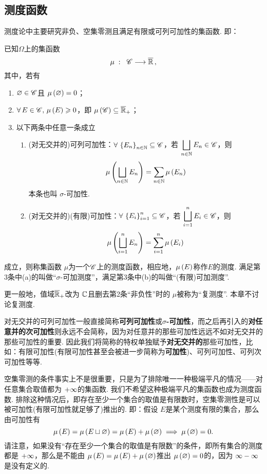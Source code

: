 \subsection{测度函数}

测度论中主要研究非负、空集零测且满足有限或可列可加性的集函数. 即：
\begin{definition}[测度函数]\label{测度函数定义}
    已知$\Omega$上的集函数
    \[\mu\;:\;\; \mathscr{C} \longrightarrow \overline{\mathbb{R}}\,,\]
    其中，若有
    \begin{enumerate}
        \item $\varnothing\in\mathscr{C}$且 $\mu\left(\varnothing\right)=0$；
        \item $\forall\,E\in\mathscr{C},\,\mu\left(E\right)\geqslant 0$，即 $\mu\left(\mathscr{C}\right)\subseteq\overline{\mathbb{R}}_+$；
        \item 以下两条中任意一条成立
        \begin{enumerate}
            \item (对无交并的)可列可加性：$\forall\,\left\{ E_n \right\}_{n\in\mathbb{N}}\subseteq\mathscr{C}$，若 $\displaystyle \bigsqcup_{n\in\mathbb{N}} E_n\in\mathscr{C}$，则
            \[  \mu\left( \bigsqcup_{n\in\mathbb{N}} E_n \right) = \sum_{n\in\mathbb{N}} \mu\left(E_n\right)  \]
            本条也叫 $\sigma$-可加性.
            \item (对无交并的)(有限)可加性：$\forall\,\left\{ E_i \right\}_{i=1}^n\subseteq\mathscr{C}$，若 $\displaystyle \bigsqcup_{i=1}^n E_i\in\mathscr{C}$，则
            \[  \mu\left( \bigsqcup_{i=1}^n E_n \right) = \sum_{i=1}^n \mu\left(E_i\right)  \]
        \end{enumerate}
    \end{enumerate}
    成立，则称集函数 $\mu$为一个$\mathscr{C}$上的测度函数，相应地，$\mu\left(E\right)$称作$E$的测度. 满足第3条中(a)的叫做“$\sigma$-可加测度”，满足第3条中(b)的叫做“(有限)可加测度”. 

    更一般地，值域$\overline{\mathbb{R}}_+$改为 $\mathbb{C}$且删去第2条“非负性”时的 $\mu$被称为“复测度”. 本章不讨论复测度.
\end{definition}
\begin{remark}
    对无交并的可列可加性一般直接简称\textbf{可列可加性}或\textbf{$\sigma$-可加性}，而之后再引入的\textbf{对任意并的次可加性}则永远不会简称，因为对任意并的那些可加性远远不如对无交并的那些可加性的重要. 因此我们将简称的特权单独赋予\textbf{对无交并的}那些可加性，比如：有限可加性(有限可加性甚至会被进一步简称为\textbf{可加性})、可列可加性、可列次可加性等等.
\end{remark}
\vspace{0.5cm}

\begin{remark}
    空集零测的条件事实上不是很重要，只是为了排除唯一一种极端平凡的情况——对任意集合取值都为 $+\infty$的集函数. 我们不希望这种极端平凡的集函数也成为测度函数. 排除这种情况后，即存在至少一个集合的取值是有限数时，空集零测性是可以被可加性(有限可加性就足够了)推出的. 即：假设 $E$是某个测度有限的集合，那么由可加性有
    \[  \mu\left(E\right)=\mu\left(E\sqcup\varnothing\right)=\mu\left(E\right)+\mu\left(\varnothing\right) \implies \mu\left(\varnothing\right)=0.  \]
    请注意，如果没有“存在至少一个集合的取值是有限数”的条件，即所有集合的测度都是 $+\infty$，那么是不能由 $\mu\left(E\right)=\mu\left(E\right)+\mu\left(\varnothing\right)$推出 $\mu\left(\varnothing\right)=0$的，因为 $\infty - \infty$是没有定义的.
\end{remark}
\vspace{0.5cm}

